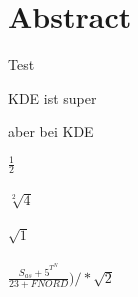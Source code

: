 \section*{Abstract}
Test

\ac{KDE} ist super

aber bei \ac{KDE}

$ \frac{1}{2} $ \\
\\
$ \sqrt[2]{4} $ \\
\\
$ \sqrt{1} $\\
\\
$ \frac{S_{as} + 5^{T^{N}}}{23+FNORD} ) / * \sqrt{2}   $